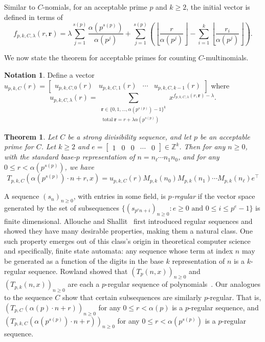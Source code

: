 \documentclass{amsart}
\newtheorem{theorem}{Theorem}
\theoremstyle{definition}
\newtheorem*{notation*}{Notation}
\DeclareMathOperator{\total}{total}
\begin{document}
Similar to $C$-nomials, for an acceptable prime $ p $ and $k\geq2$, the initial vector is defined in terms of
\[
f_{p,k,C,\lambda}(r,\mathbf{r})=\lambda\sum_{j=1}^{s(p)}\frac{\alpha(p^{s(p)})}{\alpha(p^{j})} + \sum_{j=1}^{s(p)}\left( \left\lfloor\frac{r}{\alpha(p^{j})} \right\rfloor - \sum_{i=1}^k\left\lfloor\frac{r_i}{\alpha(p^{j})} \right\rfloor \right).
\] 

We now state the theorem for acceptable primes for counting $C$-multinomials.
\begin{notation*} Define a vector $u_{p,k,C}(r)=\begin{bmatrix}
    u_{p,k,C,0}(r)&u_{p,k,C,1}(r)&\cdots&u_{p,k,C,k-1}(r)
\end{bmatrix}$ where 
$$u_{p,k,C,\lambda}(r)=\sum_{\substack{\mathbf{r} \in \{0, 1, \ldots, \alpha(p^{s(p)})-1\}^k \\ \total\mathbf{r} = r+\lambda\alpha(p^{s(p)})}}x^{f_{p,k,C,\lambda}(r, \mathbf{r})-\lambda} .$$
\end{notation*}

\begin{theorem}\label{thm:acceptable_cmultinomial}
Let $ C $ be a strong divisibility sequence, and let $ p $ be an acceptable prime for $ C $. Let $k \geq 2$ and $e=\begin{bmatrix}
    1&0&0&\cdots&0
\end{bmatrix}\in\mathbb{Z}^k$. Then for any $ n \geq 0 $, with the standard base-$p$ representation of $n = n_{\ell}\cdots n_1n_0$, and for any $ 0 \leq r < \alpha(p^{s(p)}) $, we have
\[
T_{p,k,C}(\alpha(p^{s(p)}) \cdot n + r, x)
= u_{p,k,C}(r) M_{p,k}(n_0) M_{p,k}(n_1) \cdots M_{p,k}(n_\ell) e^\intercal
\]
\end{theorem}

A sequence $(s_n)_{n\geq0}$, with entries in some field, is \emph{$p$-regular} if the vector space generated by the set of subsequences $\{(s_{p^en+i})_{n\geq 0} \colon e \geq 0 \text{ and }0\leq i \leq p^e-1\}$ is finite dimensional. Allouche and Shallit~\cite{AlloucheShallit1992} first introduced regular sequences and showed they have many desirable properties, making them a natural class. One such property emerges out of this class's origin in theoretical computer science and specifically, finite state automata: any sequence whose term at index $n$ may be generated as a function of the digits in the base $k$ representation of $n$ is a $k$-regular sequence. Rowland showed that $(T_p(n,x))_{n\geq0}$ and $(T_{p,k}(n,x))_{n\geq0}$ are each a $p$-regular sequence of polynomials~\cite{Rowland2018}. Our analogues to the sequence $C$ show that certain subsequences are similarly $p$-regular. That is, $(T_{p,C}(\alpha(p)\cdot n+r))_{n\geq0}$ for any $0 \leq r < \alpha(p)$ is a $p$-regular sequence, and $(T_{p,k,C}(\alpha(p^{s(p)})\cdot n+r))_{n\geq0}$ for any $0 \leq r < \alpha(p^{s(p)})$ is a $p$-regular sequence.
\end{document}
